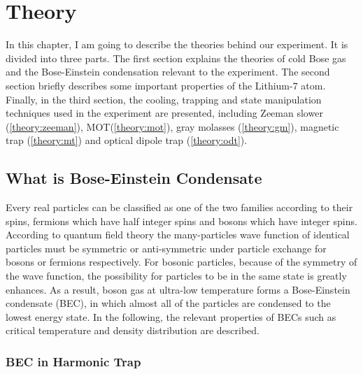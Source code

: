 \chapter{Theory}

In this chapter, I am going to describe the theories behind our experiment. It is divided into three parts. The first section explains the theories of cold Bose gas and the Bose-Einstein condensation relevant to the experiment. The second section briefly describes some important properties of the Lithium-$7$ atom. Finally, in the third section, the cooling, trapping and state manipulation techniques used in the experiment are presented, including Zeeman slower (\ref{theory:zeeman}), MOT(\ref{theory:mot}), gray molasses (\ref{theory:gm}), magnetic trap (\ref{theory:mt}) and optical dipole trap (\ref{theory:odt}).

\section{What is Bose-Einstein Condensate}\label{theory:bec}

Every real particles can be classified as one of the two families according to their spins, fermions which have half integer spins and bosons which have integer spins. According to quantum field theory\cite{spin-statistics1,spin-statistics2} the many-particles wave function of identical particles must be symmetric or anti-symmetric under particle exchange for bosons or fermions respectively. For bosonic particles, because of the symmetry of the wave function, the possibility for particles to be in the same state is greatly enhances. As a result, boson gas at ultra-low temperature forms a Bose-Einstein condensate (BEC), in which almost all of the particles are condensed to the lowest energy state. In the following, the relevant properties of BECs such as critical temperature and density distribution are described.

\subsection{BEC in Harmonic Trap}

